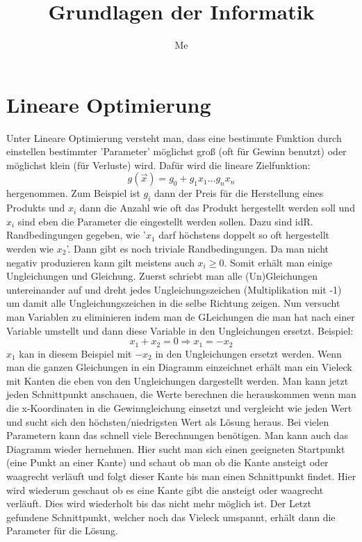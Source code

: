 \documentclass[a4paper]{scrartcl}
\author{Me}
\title{Grundlagen der Informatik}
\begin{document}
    \maketitle
    \newpage
    \tableofcontents
    \newpage

    \section{Lineare Optimierung}
    Unter Lineare Optimierung versteht man, dass eine bestimmte Funktion durch einstellen bestimmter 'Parameter' möglichst groß (oft für Gewinn benutzt) oder möglichst klein (für Verluste) wird.
    Dafür wird die lineare Zielfunktion: 
    \begin{equation*}
        g(\vec{x}) = g_0 + g_1x_1 \ldots g_nx_n
    \end{equation*}
    hergenommen. Zum Beispiel ist \(g_i\) dann der Preis für die Herstellung eines Produkts und \(x_i\) dann die Anzahl wie oft das Produkt hergestellt werden soll und \(x_i\) sind eben die 
    Parameter die eingestellt werden sollen. Dazu sind idR. Randbedingungen gegeben, wie '\(x_1\) darf höchstens doppelt so oft hergestellt werden wie \(x_2\)'. Dann gibt es noch triviale 
    Randbedingungen. Da man nicht negativ produzieren kann gilt meistens auch \(x_i \ge 0\). Somit erhält man einige Ungleichungen und Gleichung. Zuerst schriebt man alle (Un)Gleichungen 
    untereinander auf und dreht jedes Ungleichungszeichen (Multiplikation mit -1) um damit alle Ungleichungszeichen in die selbe Richtung zeigen. Nun versucht man Variablen zu eliminieren
    indem man de GLeichungen die man hat nach einer Variable umstellt und dann diese Variable in den Ungleichungen ersetzt. Beispiel:
    \begin{equation*}
        x_1 + x_2 = 0 \Rightarrow x_1 = -x_2    
    \end{equation*}
    \(x_1\) kan in diesem Beispiel mit \(-x_2\) in den Ungleichungen ersetzt werden. Wenn man die ganzen Gleichungen in ein Diagramm einzeichnet erhält man ein Vieleck mit Kanten die eben 
    von den Ungleichungen dargestellt werden. Man kann jetzt jeden Schnittpunkt anschauen, die Werte berechnen die herauskommen wenn man die x-Koordinaten in die Gewinngleichung einsetzt und
    vergleicht wie jeden Wert und sucht sich den höchsten/niedrigsten Wert als Lösung heraus. Bei vielen Parametern kann das schnell viele Berechnungen benötigen. Man kann auch das Diagramm wieder
    hernehmen. Hier sucht man sich einen geeigneten Startpunkt (eine Punkt an einer Kante) und schaut ob man ob die Kante ansteigt oder waagrecht verläuft und folgt dieser Kante bis man 
    einen Schnittpunkt findet. Hier wird wiederum geschaut ob es eine Kante gibt die ansteigt oder waagrecht verläuft. Dies wird wiederholt bis das nicht mehr möglich ist. Der Letzt gefundene
    Schnittpunkt, welcher noch das Vieleck umspannt, erhält dann die Parameter für die Lösung. 
\end{document}

